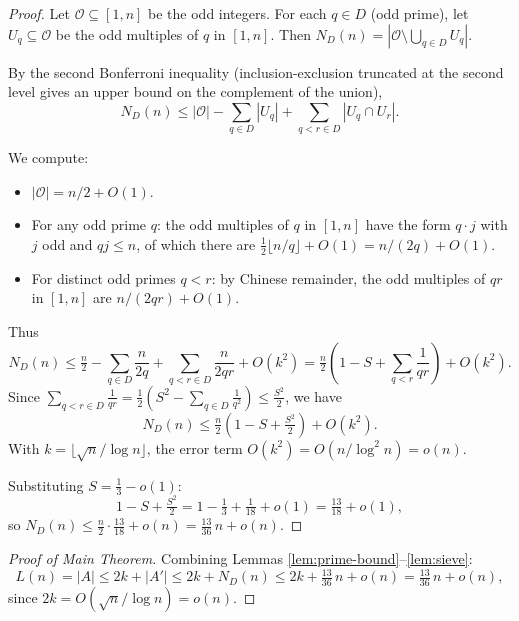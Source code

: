 \documentclass{article}
\begin{document}
\begin{proof}
Let $\mathcal{O} \subseteq [1, n]$ be the odd integers. For each $q \in D$ (odd prime), let $U_q \subseteq \mathcal{O}$ be the odd multiples of $q$ in $[1, n]$. Then $N_D(n) = |\mathcal{O} \setminus \bigcup_{q \in D} U_q|$.

By the second Bonferroni inequality (inclusion-exclusion truncated at the second level gives an upper bound on the complement of the union),
\[
N_D(n) \le |\mathcal{O}| - \sum_{q \in D} |U_q| + \sum_{q < r \in D} |U_q \cap U_r|.
\]

We compute:
\begin{itemize}
  \item $|\mathcal{O}| = n/2 + O(1)$.
  \item For any odd prime $q$: the odd multiples of $q$ in $[1, n]$ have the form $q \cdot j$ with $j$ odd and $qj \le n$, of which there are $\tfrac{1}{2} \lfloor n/q \rfloor + O(1) = n/(2q) + O(1)$.
  \item For distinct odd primes $q < r$: by Chinese remainder, the odd multiples of $qr$ in $[1, n]$ are $n/(2qr) + O(1)$.
\end{itemize}
Thus
\[
N_D(n) \le \tfrac{n}{2} - \sum_{q \in D} \frac{n}{2q} + \sum_{q < r \in D} \frac{n}{2qr} + O(k^2) = \tfrac{n}{2}\!\left(1 - S + \sum_{q<r} \frac{1}{qr}\right) + O(k^2).
\]
Since $\sum_{q < r \in D} \tfrac{1}{qr} = \tfrac{1}{2}\!\left(S^2 - \sum_{q \in D} \tfrac{1}{q^2}\right) \le \tfrac{S^2}{2}$, we have
\[
N_D(n) \le \tfrac{n}{2}\!\left(1 - S + \tfrac{S^2}{2}\right) + O(k^2).
\]
With $k = \lfloor \sqrt n / \log n \rfloor$, the error term $O(k^2) = O(n/\log^2 n) = o(n)$.

Substituting $S = \tfrac{1}{3} - o(1)$:
\[
1 - S + \tfrac{S^2}{2} = 1 - \tfrac{1}{3} + \tfrac{1}{18} + o(1) = \tfrac{13}{18} + o(1),
\]
so $N_D(n) \le \tfrac{n}{2} \cdot \tfrac{13}{18} + o(n) = \tfrac{13}{36}\, n + o(n)$.
\end{proof}

\begin{proof}[Proof of Main Theorem]
Combining Lemmas \ref{lem:prime-bound}–\ref{lem:sieve}:
\[
L(n) = |A| \le 2k + |A'| \le 2k + N_D(n) \le 2k + \tfrac{13}{36}\,n + o(n) = \tfrac{13}{36}\,n + o(n),
\]
since $2k = O(\sqrt{n}/\log n) = o(n)$.
\end{proof}
\end{document}
